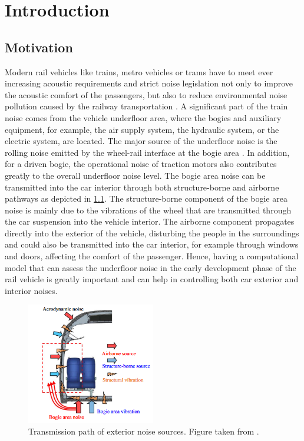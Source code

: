 \chapter{Introduction}
\label{chap:Introduction}

\section{Motivation}

Modern rail vehicles like trains, metro vehicles or trams have to meet ever increasing acoustic requirements and strict noise legislation not only to improve the acoustic comfort of the passengers, but also to reduce environmental noise pollution caused by the railway transportation \cite{paozalyte_pollution_2011, li_25d_2021, zhang_sound_2019}.
A significant part of the train noise comes from the vehicle underfloor area, where the bogies and auxiliary equipment, for example, the air supply system, the hydraulic system, or the electric system, are located. The major source of the underfloor noise is the rolling noise emitted by the wheel-rail interface at the bogie area \cite{LUNDEN20093}. In addition, for a driven bogie, the operational noise of traction motors also contributes greatly to the overall underfloor noise level\cite{Noh_2017, zhang_sound_2019}.
The bogie area noise can be transmitted into the car interior through both structure-borne and airborne pathways as depicted in \cref{fig:transmission_path}. The structure-borne component of the bogie area noise is mainly due to the vibrations of the wheel that are transmitted through the car suspension into the vehicle interior. 
The airborne component propagates directly into the exterior of the vehicle, disturbing the people in the surroundings and could also be transmitted into the car interior, for example through windows and doors, affecting the comfort of the passenger.
%
Hence, having a computational model that can assess the underfloor noise in the early development phase of the rail vehicle is greatly important and can help in controlling both car exterior and interior noises.

\begin{figure}
	\centering
	\includegraphics[width=0.5\textwidth]{fig/noise_transmission_path.png}
	\caption{Transmission path of exterior noise sources. Figure taken from \cite{zhang_sound_2019}.}
	\label{fig:transmission_path}
\end{figure}


